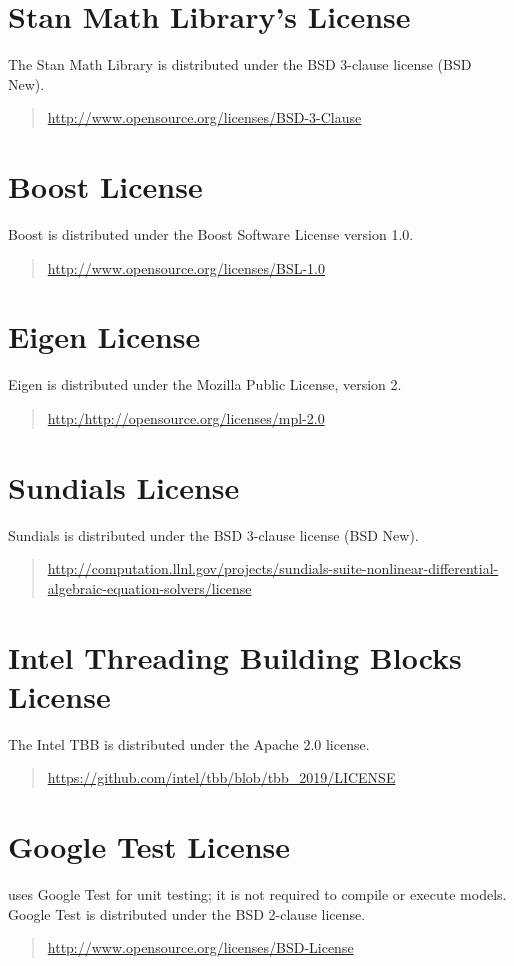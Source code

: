 \section{Stan Math Library's License}

The Stan Math Library is distributed under the BSD 3-clause license (BSD New).
%
\begin{quote}
\url{http://www.opensource.org/licenses/BSD-3-Clause}
\end{quote}

\section{Boost License}

Boost is distributed under the Boost Software
License version 1.0.
%
\begin{quote}
\url{http://www.opensource.org/licenses/BSL-1.0}
\end{quote}

\section{Eigen License} 
%
Eigen is distributed under the Mozilla Public License,
version 2.
%
\begin{quote}
\url{http:/http://opensource.org/licenses/mpl-2.0}
\end{quote}

\section{Sundials License} 
%
Sundials is distributed under the BSD 3-clause license (BSD New).
%
\begin{quote}
\url{http://computation.llnl.gov/projects/sundials-suite-nonlinear-differential-algebraic-equation-solvers/license}
\end{quote}

\section{Intel Threading Building Blocks License} 
%
The Intel TBB is distributed under the Apache 2.0 license.
%
\begin{quote}
\url{https://github.com/intel/tbb/blob/tbb_2019/LICENSE}
\end{quote}

\section{Google Test License}

\CmdStan uses Google Test for unit testing; it is not required to
compile or execute models.  Google Test is distributed under the BSD
2-clause license.
%
\begin{quote}
\url{http://www.opensource.org/licenses/BSD-License}
\end{quote}

